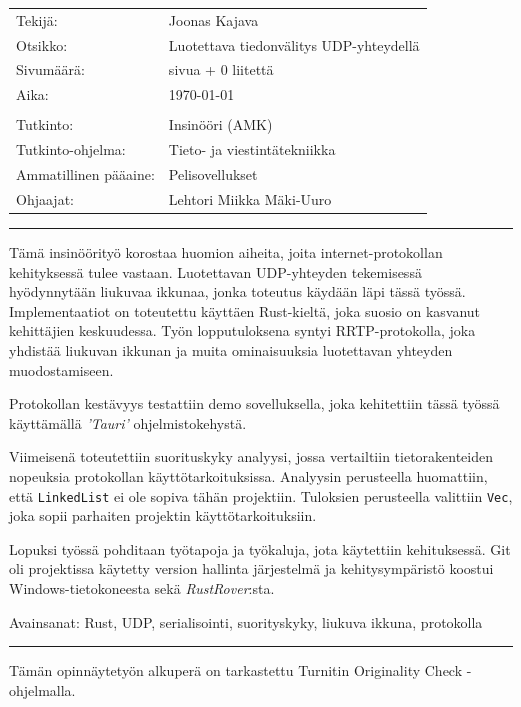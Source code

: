 \documentclass[a4paper,12pt]{article}
\newcommand{\me}{Joonas Kajava}
\renewcommand{\title}{Luotettava tiedonvälitys UDP-yhteydellä}
\newcommand{\appendixCount}{0}
\newcommand{\pageCount}{ \pageref{LastPage}}
\newcommand*\sepline{
    \begin{center}
        \rule[1ex]{\textwidth}{.5pt}
    \end{center}}
\begin{document}
\begin{titlepage}
        \begin{tabular} {l l}
            Tekijä:               & \me                                            \\
            Otsikko:              & \title                                         \\
            Sivumäärä:            & \pageCount{} sivua + \appendixCount{} liitettä \\
            Aika:                 & \today                                         \\
            \\
            Tutkinto: & Insinööri (AMK) \\
            Tutkinto-ohjelma: & Tieto- ja viestintätekniikka \\
            Ammatillinen pääaine: & Pelisovellukset \\
            Ohjaajat: & Lehtori Miikka Mäki-Uuro\\
        \end{tabular}
        \sepline
        Tämä insinöörityö korostaa huomion aiheita, joita internet-protokollan kehityksessä tulee vastaan. Luotettavan UDP-yhteyden tekemisessä hyödynnytään liukuvaa ikkunaa, jonka toteutus käydään läpi tässä työssä. Implementaatiot on toteutettu käyttäen Rust-kieltä, joka suosio on kasvanut kehittäjien keskuudessa. Työn lopputuloksena syntyi RRTP-protokolla, joka yhdistää liukuvan ikkunan ja muita ominaisuuksia luotettavan yhteyden muodostamiseen. \par

        Protokollan kestävyys testattiin demo sovelluksella, joka kehitettiin tässä työssä käyttämällä \textit{'Tauri'} ohjelmistokehystä.\par

        Viimeisenä toteutettiin suorituskyky analyysi, jossa vertailtiin tietorakenteiden nopeuksia protokollan käyttötarkoituksissa. Analyysin perusteella huomattiin, että \lstinline{LinkedList} ei ole sopiva tähän projektiin. Tuloksien perusteella valittiin \lstinline{Vec}, joka sopii parhaiten projektin käyttötarkoituksiin.\par

        Lopuksi työssä pohditaan työtapoja ja työkaluja, jota käytettiin kehituksessä. Git oli projektissa käytetty version hallinta järjestelmä ja kehitysympäristö koostui Windows-tietokoneesta sekä \textit{RustRover}:sta. \par
        Avainsanat: Rust, UDP, serialisointi, suorityskyky, liukuva ikkuna, protokolla 
        \sepline
        Tämän opinnäytetyön alkuperä on tarkastettu Turnitin Originality Check -ohjelmalla.
        \newpage


\end{titlepage}
\end{document}

